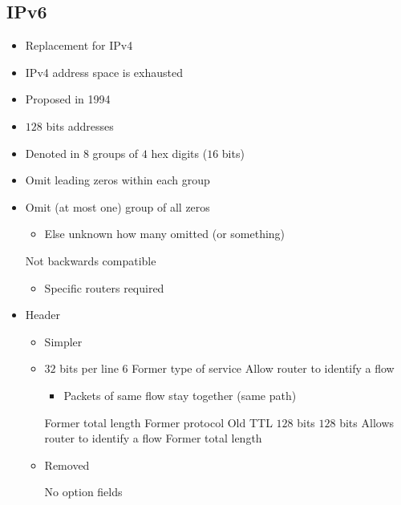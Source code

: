 \subsection{IPv6}
\begin{itemize}
    \item Replacement for IPv4
    \item IPv4 address space is exhausted
    \item Proposed in 1994
    \item $128$ bits addresses
    \item Denoted in $8$ groups of $4$ hex digits ($16$ bits)
    \item Omit leading zeros within each group
    \item Omit (at most one) group of all zeros
        \begin{itemize}
            \item Else unknown how many omitted (or something)
        \end{itemize}
    \icon Not backwards compatible
        \begin{itemize}
            \item Specific routers required
        \end{itemize}
    \item Header
        \begin{itemize}
            \item Simpler
            \item $32$ bits per line
                 6
                 Former type of service
                 Allow router to identify a flow
                \begin{itemize}
                    \item Packets of same flow stay together (same path)
                \end{itemize}
                 Former total length
                 Former protocol
                 Old TTL
                 $128$ bits
                 $128$ bits
             Allows router to identify a flow
             Former total length
            \item Removed
                \begin{itemize}
                        \begin{itemize}
                             No option fields

\end{itemize}
\end{itemize}
\end{itemize}
\end{itemize}
